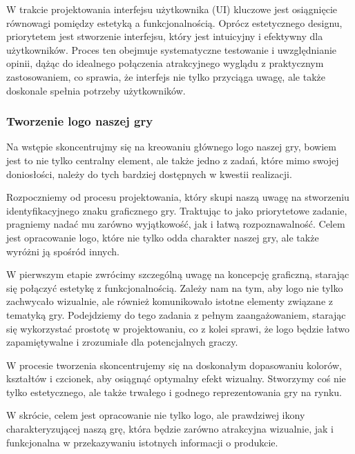 W trakcie projektowania interfejsu użytkownika (UI) kluczowe jest osiągnięcie równowagi pomiędzy estetyką a funkcjonalnością. Oprócz estetycznego designu, priorytetem jest stworzenie interfejsu, który jest intuicyjny i efektywny dla użytkowników. Proces ten obejmuje systematyczne testowanie i uwzględnianie opinii, dążąc do idealnego połączenia atrakcyjnego wyglądu z praktycznym zastosowaniem, co sprawia, że interfejs nie tylko przyciąga uwagę, ale także doskonale spełnia potrzeby użytkowników.

\subsubsection{Tworzenie logo naszej gry}
Na wstępie skoncentrujmy się na kreowaniu głównego logo naszej gry, bowiem jest to nie tylko centralny element, ale także jedno z zadań, które mimo swojej doniosłości, należy do tych bardziej dostępnych w kwestii realizacji.

Rozpoczniemy od procesu projektowania, który skupi naszą uwagę na stworzeniu identyfikacyjnego znaku graficznego gry. Traktując to jako priorytetowe zadanie, pragniemy nadać mu zarówno wyjątkowość, jak i łatwą rozpoznawalność. Celem jest opracowanie logo, które nie tylko odda charakter naszej gry, ale także wyróżni ją spośród innych.

W pierwszym etapie zwrócimy szczególną uwagę na koncepcję graficzną, starając się połączyć estetykę z funkcjonalnością. Zależy nam na tym, aby logo nie tylko zachwycało wizualnie, ale również komunikowało istotne elementy związane z tematyką gry. Podejdziemy do tego zadania z pełnym zaangażowaniem, starając się wykorzystać prostotę w projektowaniu, co z kolei sprawi, że logo będzie łatwo zapamiętywalne i zrozumiałe dla potencjalnych graczy.

W procesie tworzenia skoncentrujemy się na doskonałym dopasowaniu kolorów, kształtów i czcionek, aby osiągnąć optymalny efekt wizualny. Stworzymy coś nie tylko estetycznego, ale także trwałego i godnego reprezentowania gry na rynku.

W skrócie, celem jest opracowanie nie tylko logo, ale prawdziwej ikony charakteryzującej naszą grę, która będzie zarówno atrakcyjna wizualnie, jak i funkcjonalna w przekazywaniu istotnych informacji o produkcie.

